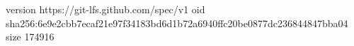 version https://git-lfs.github.com/spec/v1
oid sha256:6e9e2cbb7ecaf21e97f34183bd6d1b72a6940ffc20be0877dc236844847bba04
size 174916
